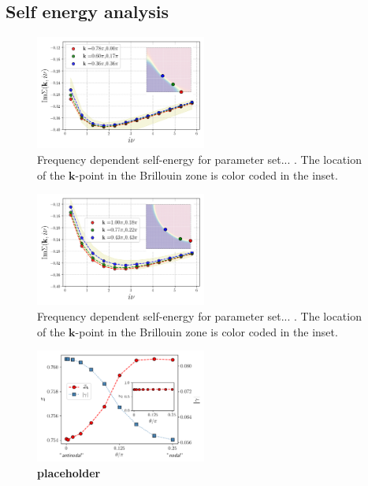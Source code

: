 \subsection{Self energy analysis}


\begin{figure}
\includegraphics[width=0.50\textwidth]{images/Self_Im_occ0600.png}
\caption{Frequency dependent self-energy for parameter set... .
The location of the $\mathbf{k}$-point in the Brillouin zone is color coded in the inset. }
\label{fig:selffermi0600}
\end{figure}


\begin{figure}
\includegraphics[width=0.50\textwidth]{images/Self_Im_occ0975.png}
\caption{Frequency dependent self-energy for parameter set... .
The location of the $\mathbf{k}$-point in the Brillouin zone is color coded in the inset. }
\label{fig:selffermi0975}
\end{figure}



\begin{figure}
\includegraphics[width=0.5\textwidth]{images/z_and_gamma975.png}
\caption{\textbf{placeholder} }
\label{fig:zetaandgamma}
\end{figure}

